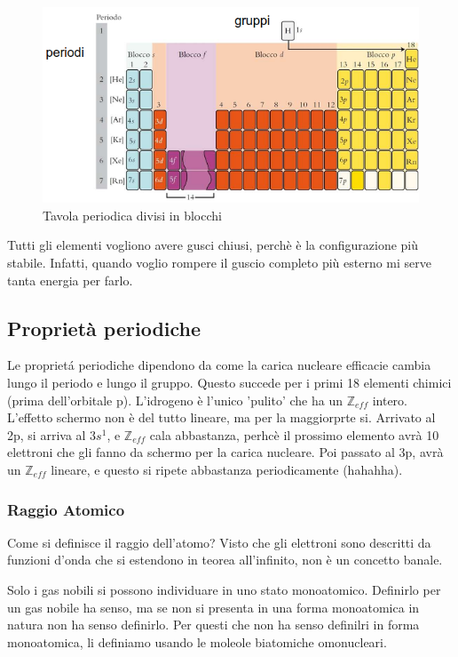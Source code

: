 \documentclass[a4paper]{article}
\begin{document}
\begin{figure}[!h]
    \centering
    \includegraphics[width=\textwidth]{tavolaperiodicablocchi.png}
    \caption{Tavola periodica divisi in blocchi}
\end{figure}
\FloatBarrier

Tutti gli elementi vogliono avere gusci chiusi, perchè è la configurazione più stabile. Infatti, quando voglio rompere il guscio completo più esterno mi serve tanta energia per farlo. 

\subsection{Proprietà periodiche}
Le proprietá periodiche dipendono da come la carica nucleare efficacie cambia lungo il periodo e lungo il gruppo. Questo succede per i primi 18 elementi chimici (prima dell'orbitale p). L'idrogeno è l'unico 'pulito' che ha un $\mathbb{Z}_{eff}$ intero. L'effetto schermo non è del tutto lineare, ma per la maggiorprte si. Arrivato al 2p, si arriva al $3s^1$, e $\mathbb{Z}_{eff}$ cala abbastanza, perhcè il prossimo elemento avrà 10 elettroni che gli fanno da schermo per la carica nucleare. Poi passato al 3p, avrà un $\mathbb{Z}_{eff}$ lineare, e questo si ripete abbastanza periodicamente (hahahha).

\subsubsection{Raggio Atomico}
Come si definisce il raggio dell'atomo? Visto che gli elettroni sono descritti da funzioni d'onda che si estendono in teorea all'infinito, non è un concetto banale. 

Solo i gas nobili si possono individuare in uno stato monoatomico. Definirlo per un gas nobile ha senso, ma se non si presenta in una forma monoatomica in natura non ha senso definirlo. Per questi che non ha senso definilri in forma monoatomica, li definiamo usando le moleole biatomiche omonucleari.
\end{document}
